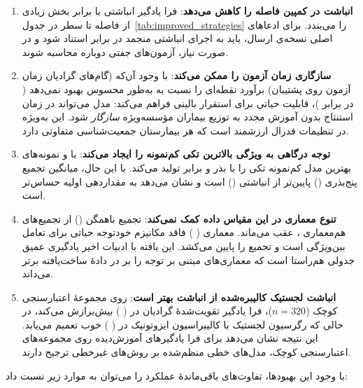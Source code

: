 \begin{enumerate}
\item \textbf{انباشت در کمپین  فاصله را کاهش می‌دهد}: فرا یادگیر انباشتی  با  برابر  بخش زیادی از فاصله تا سطر  در جدول~\ref{tab:improved_strategies} را می‌بندد. برای ادعاهای اصلی نسخه‌ی ارسال، باید به اجرای انباشتی منجمد \textbf{} در برابر \textbf{} استناد شود و در صورت نیاز، آزمون‌های جفتی دوباره محاسبه شوند.

\item \textbf{ سازگاری زمان آزمون را ممکن می‌کند}: با وجود آن‌که  (گام‌های گرادیان زمان آزمون روی پشتیبان) برآورد نقطه‌ای را نسبت به  به‌طور محسوس بهبود نمی‌دهد ( در برابر )، قابلیت حیاتی برای استقرار بالینی فراهم می‌کند: مدل می‌تواند در زمان استنتاج بدون آموزش مجدد به توزیع بیماران مؤسسه‌ویژه \emph{سازگار} شود. این به‌ویژه در تنظیمات فدرال ارزشمند است که هر بیمارستان جمعیت‌شناسی متفاوتی دارد.

\item \textbf{توجه درگاهی به ویژگی بالاترین  تکی کم‌نمونه را ایجاد می‌کند}:  با  و نمونه‌های  بهترین مدل کم‌نمونه تکی را با بذر  و  برابر  تولید می‌کند. با این حال، میانگین تجمیع پنج‌بذری () پایین‌تر از انباشتی  () است و نشان می‌دهد  به مقداردهی اولیه حساس‌تر است.

\item \textbf{تنوع معماری در این مقیاس داده کمک نمی‌کند}: تجمیع ناهمگن  () از تجمیع‌های هم‌معماری ،  عقب می‌ماند. معماری  ( ) فاقد مکانیزم خودتوجه حیاتی برای تعامل بین‌ویژگی است و تجمیع را پایین می‌کشد. این یافته با ادبیات اخیر یادگیری عمیق جدولی هم‌راستا است که معماری‌های مبتنی بر توجه را بر  در دادۀ ساخت‌یافته برتر می‌داند.

\item \textbf{انباشت لجستیک کالیبره‌شده از انباشت  بهتر است}: روی مجموعۀ اعتبارسنجی کوچک ($n=320$)، فرا یادگیر تقویت‌شدۀ گرادیان در  ( ) بیش‌برازش می‌کند، در حالی که رگرسیون لجستیک با کالیبراسیون ایزوتونیک در  ( ) خوب تعمیم می‌یابد. این نتیجه نشان می‌دهد برای فرا یادگیرهای آموزش‌دیده روی مجموعه‌های اعتبارسنجی کوچک، مدل‌های خطی منظم‌شده بر روش‌های  غیرخطی ترجیح دارند.
\end{enumerate}

با وجود این بهبودها، تفاوت‌های باقی‌ماندۀ عملکرد را می‌توان به موارد زیر نسبت داد:

